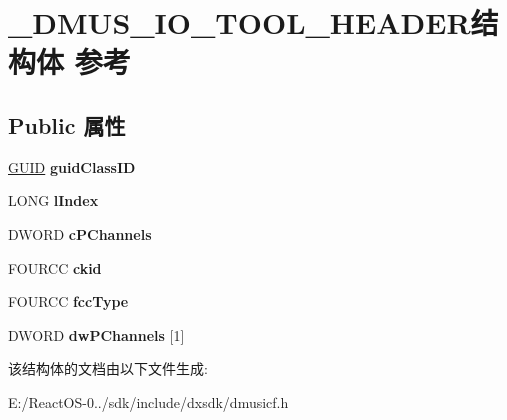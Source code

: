 \hypertarget{struct___d_m_u_s___i_o___t_o_o_l___h_e_a_d_e_r}{}\section{\+\_\+\+D\+M\+U\+S\+\_\+\+I\+O\+\_\+\+T\+O\+O\+L\+\_\+\+H\+E\+A\+D\+E\+R结构体 参考}
\label{struct___d_m_u_s___i_o___t_o_o_l___h_e_a_d_e_r}
\subsection*{Public 属性}
\begin{DoxyCompactItemize}
\item 
\mbox{\label{struct___d_m_u_s___i_o___t_o_o_l___h_e_a_d_e_r_a654796f0651a069548e6acd4cbfec4e7}} 
\hyperlink{interface_g_u_i_d}{G\+U\+ID} {\bfseries guid\+Class\+ID}
\item 
\mbox{\label{struct___d_m_u_s___i_o___t_o_o_l___h_e_a_d_e_r_aaf470f832002cd13779c23f3318b3126}} 
L\+O\+NG {\bfseries l\+Index}
\item 
\mbox{\label{struct___d_m_u_s___i_o___t_o_o_l___h_e_a_d_e_r_addbf130e2f24b6c509cd599818c8a9a6}} 
D\+W\+O\+RD {\bfseries c\+P\+Channels}
\item 
\mbox{\label{struct___d_m_u_s___i_o___t_o_o_l___h_e_a_d_e_r_a52cf351a43b3699142b2ae301b38056f}} 
F\+O\+U\+R\+CC {\bfseries ckid}
\item 
\mbox{\label{struct___d_m_u_s___i_o___t_o_o_l___h_e_a_d_e_r_a25644e9856d7f945695b0aaa25372345}} 
F\+O\+U\+R\+CC {\bfseries fcc\+Type}
\item 
\mbox{\label{struct___d_m_u_s___i_o___t_o_o_l___h_e_a_d_e_r_a3379dd593fbc0aed0d394ff9c235dee8}} 
D\+W\+O\+RD {\bfseries dw\+P\+Channels} \mbox{[}1\mbox{]}
\end{DoxyCompactItemize}


该结构体的文档由以下文件生成\+:\begin{DoxyCompactItemize}
\item 
E\+:/\+React\+O\+S-\/0../sdk/include/dxsdk/dmusicf.\+h\end{DoxyCompactItemize}
